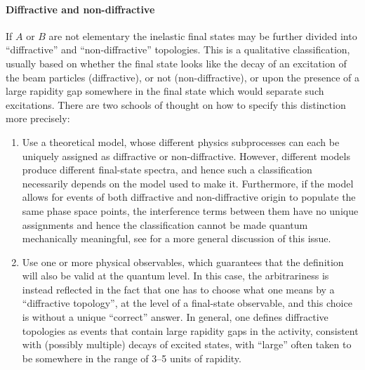 \paragraph{Diffractive and non-diffractive}
If $A$ or $B$ are not elementary the inelastic final states may be
further divided into ``diffractive'' and ``non-diffractive''
topologies. This is a qualitative classification, usually based on
whether the final state looks like
the decay of an excitation of the beam particles 
(diffractive), or not (non-diffractive), or upon the presence of a
large rapidity gap somewhere in the final state which would separate such excitations.
There  are two schools of thought on how to specify this distinction more precisely: 
\begin{enumerate}
\item Use a theoretical model, whose 
different physics subprocesses can each be uniquely assigned as 
diffractive or non-diffractive. 
However, different models produce different final-state spectra,
and hence such a classification necessarily depends on
the model used to make it. Furthermore, if the 
model allows for events of both diffractive and non-diffractive origin
to populate the same phase space points, the
interference terms between them have no unique assignments and hence 
the classification cannot be made quantum mechanically meaningful, see
 for a more general 
discussion of this issue. 
\item
Use one or more physical observables, which
guarantees that the definition will also be valid at the quantum level. 
In this case, the arbitrariness is instead reflected
in the fact that one has to choose what one means by a ``diffractive
topology'', at the level of a final-state observable, and this 
choice is without a unique ``correct'' answer. In general, one defines
diffractive topologies as 
events that contain large rapidity gaps in the activity,
consistent with (possibly multiple) decays of excited states, 
with ``large'' often taken to be 
somewhere in the range of 3--5 units of rapidity.
\end{enumerate}

